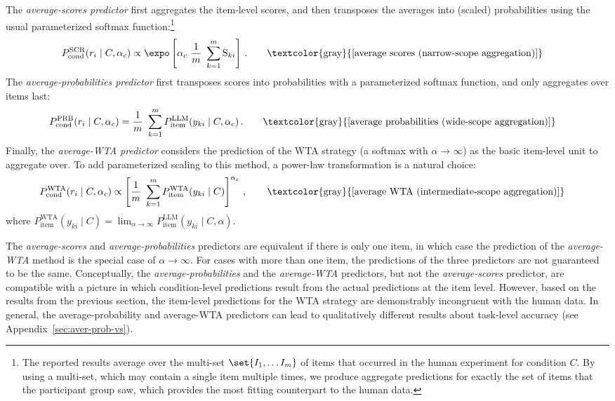 \documentclass[fleqn]{article}
\begin{document}
The \emph{average-scores predictor} first aggregates the item-level scores, and then transposes the averages into (scaled) probabilities using the usual parameterized softmax function:\footnote{
  The reported results average over the multi-set \(\set{I_1, \dots I_m}\) of items that occurred in the human experiment for condition $C$.
  By using a multi-set, which may contain a single item multiple times, we produce aggregate predictions for exactly the set of items that the participant group saw, which provides the most fitting counterpart to the human data.}
%
\begin{align*}
  & P_{\text{cond}}^{\text{SCR}}(r_{i} \mid C, \alpha_{c})
    \propto \expo \left [  \alpha_{c} \ \frac{1}{m} \ \sum_{k=1}^{m} \text{S}_{ki}  \right ] \,.
    \tag*{\textcolor{gray}{[average scores (narrow-scope aggregation)]}}
\end{align*}
%
The \emph{average-probabilities predictor} first transposes scores into probabilities with a parameterized softmax function, and only aggregates over items last:
\begin{align*}
  & P_{\text{cond}}^{\text{PRB}}(r_{i} \mid C, \alpha_{c})
    = \frac{1}{m} \ \sum_{k=1}^{m} P_{\text{item}}^{\text{LLM}}(y_{ki} \mid C, \alpha_{c}) \,.
    \tag*{\textcolor{gray}{[average probabilities (wide-scope aggregation)]}}
\end{align*}
%
Finally, the \emph{average-WTA predictor} considers the prediction of the WTA strategy (a softmax with $\alpha \rightarrow \infty$) as the basic item-level unit to aggregate over.
To add parameterized scaling to this method, a power-law transformation is a natural choice:
\begin{align*}
  & P_{\text{cond}}^{\text{WTA}}(r_{i} \mid C, \alpha_{c})
    \propto  \left [ \frac{1}{m} \ \sum_{k=1}^{m} P_{\text{item}}^{\text{WTA}}(y_{ki} \mid C) \right ]^{\alpha_{c}}\,,
    \tag*{\textcolor{gray}{[average WTA (intermediate-scope aggregation)]}}
\end{align*}
where $P_{\text{item}}^{\text{WTA}}(y_{ki} \mid C) = \lim_{\alpha \rightarrow \infty} P_{\text{item}}^{\text{LLM}}(y_{ki} \mid C, \alpha)$.
\bigskip


The \emph{average-scores} and \emph{average-probabilities} predictors are equivalent if there is only one item, in which case the prediction of the \emph{average-WTA} method is the special case of $\alpha \rightarrow \infty$.
For cases with more than one item, the predictions of the three predictors are not guaranteed to be the same.
Conceptually, the \emph{average-probabilities} and the \emph{average-WTA} predictors, but not the \emph{average-scores} predictor, are compatible with a picture in which condition-level predictions result from the actual predictions at the item level.
However, based on the results from the previous section, the item-level predictions for the WTA strategy are demonstrably incongruent with the human data.
In general, the average-probability and average-WTA predictors can lead to qualitatively different results about task-level accuracy (see Appendix~\ref{sec:aver-prob-vs}).
\end{document}

